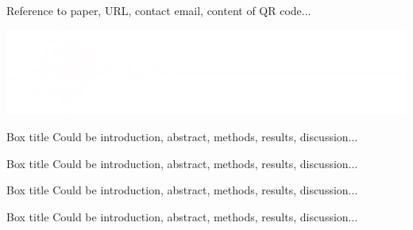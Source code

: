 \documentclass[
    a0paper, %
    landscape, %
    fontscale=0.4 %
    ]{baposter}
\begin{document}
\begin{poster}
\begin{posterbox}
    
    \hfill 
    \colorbox{white}{ 
    } \hspace{0.3em}
    
    \vspace{1em}
    
    \hfill {\normalsize Reference to paper, URL, contact email, content of QR code... } \hspace{0.3em}
    
     \vspace{-2.6em}
     \includegraphics[width=\textwidth, trim= 3 8 3 0]{footer-white.png}
\end{posterbox}


\begin{posterbox}[
    name = box1,  %
    column = 0, %
    ]{Box title}
    Could be introduction, abstract, methods, results, discussion...
\end{posterbox}


\begin{posterbox}[
    name = box2,  %
    column = 0, %
    below = box1 %
    ]{Box title}
    Could be introduction, abstract, methods, results, discussion...
\end{posterbox}


\begin{posterbox}[
    name = box3,  %
    column = 0, %
    below = box2 %
    ]{Box title}
    Could be introduction, abstract, methods, results, discussion...
\end{posterbox}


\begin{posterbox}[
    name = box4,  %
    column = 0, %
    below = box3, %
    bottomaligned = message, %
    ]{Box title}
    Could be introduction, abstract, methods, results, discussion...
\end{posterbox}



\end{poster}
\end{document}
